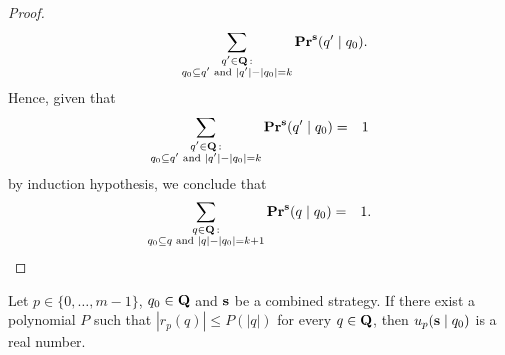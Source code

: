 \begin{proof}
\begin{align*}
&\hspace{30pt}\sum_{\substack{q' \in \mathbf{Q} \,: \\ q_0 \subseteq q' \text{ {\rm and} } |q'| - |q_0| = k}}
\mathbf{Pr}^{\mathbf{s}}(q' \mid q_0).
\end{align*}
Hence, given that
\begin{eqnarray*}
\sum_{\substack{q' \in \mathbf{Q} \,: \\ q_0 \subseteq q' \text{ {\rm and} } |q'| - |q_0| = k}}
\mathbf{Pr}^{\mathbf{s}}(q' \mid q_0) & = & 1
\end{eqnarray*}
by induction hypothesis, we conclude that
\begin{eqnarray*}
\sum_{\substack{q \in \mathbf{Q} \,: \\ q_0 \subseteq q \text{ {\rm and} } |q| - |q_0| = k+1}}
\mathbf{Pr}^{\mathbf{s}}(q \mid q_0) & = & 1.
\end{eqnarray*}
\end{proof}

\begin{myprop}\label{prop-conv}
Let $p \in \{0, \ldots, m-1\}$, $q_0 \in \mathbf{Q}$ and $\mathbf{s}$ be a combined strategy. If there exist a polynomial $P$ such that $|r_p(q)| \leq P(|q|)$ for every $q \in \mathbf{Q}$, then $u_p(\mathbf{s} \mid q_0)$ is a real number.
\end{myprop}

